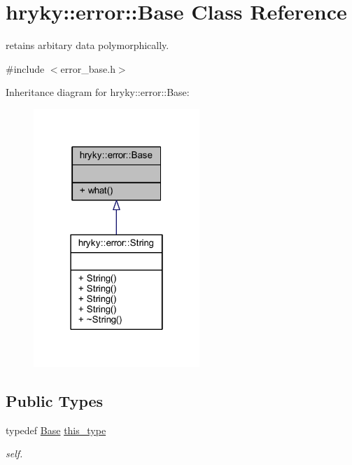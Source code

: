 \hypertarget{classhryky_1_1error_1_1_base}{\section{hryky\-:\-:error\-:\-:Base Class Reference}
\label{classhryky_1_1error_1_1_base}
}


retains arbitary data polymorphically.  




{\ttfamily \#include $<$error\-\_\-base.\-h$>$}



Inheritance diagram for hryky\-:\-:error\-:\-:Base\-:
\nopagebreak
\begin{figure}[H]
\begin{center}
\leavevmode
\includegraphics[width=178pt]{classhryky_1_1error_1_1_base__inherit__graph}
\end{center}
\end{figure}
\subsection*{Public Types}
\begin{DoxyCompactItemize}
\item 
\hypertarget{classhryky_1_1error_1_1_base_a7d07231e2ff50487bae34d684a5b6595}{typedef \hyperlink{classhryky_1_1error_1_1_base}{Base} \hyperlink{classhryky_1_1error_1_1_base_a7d07231e2ff50487bae34d684a5b6595}{this\-\_\-type}}\label{classhryky_1_1error_1_1_base_a7d07231e2ff50487bae34d684a5b6595}

\begin{DoxyCompactList}\small\item\em self. \end{DoxyCompactList}\end{DoxyCompactItemize}
